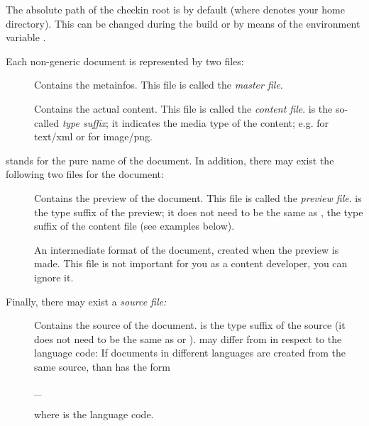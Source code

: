 \documentclass{generic}
\begin{document}
The absolute path of the checkin root is  by default
(where \code{\~} denotes your home directory). This can be changed during the
build or by means of the environment variable .

Each non-generic document is represented by two files:

\begin{description}
\item[]
  Contains the metainfos. This file is called the \emph{master file}.
\item[]
  Contains the actual content. This file is called the \emph{content
    file}.  is the so-called \emph{type suffix}; it indicates the
  media type of the content; e.g.  for text/xml or  for
  image/png.
\end{description}

 stands for the pure name of the document. In addition, there
may exist the following two files for the document:

\begin{description}
\item[]
  Contains the preview of the document.  This file is called the \emph{preview
    file}.  is the type suffix of the preview; it does not need to
  be the same as , the type suffix of the content file (see examples
  below).
\item[]
  An intermediate format of the document, created when the preview is
  made. This file is not important for you as a content developer, you can
  ignore it.
\end{description}

Finally, there may exist a \emph{source file:}

\begin{description}
\item[]
  Contains the source of the document.  is the type suffix of the
  source (it does not need to be the same as  or
  ).  may differ from  in respect to the language
  code: If documents in different languages are created from the same source,
  than  has the form

  \begin{preformatted}_\end{preformatted}

  where  is the language code.
\end{description}
\end{document}

